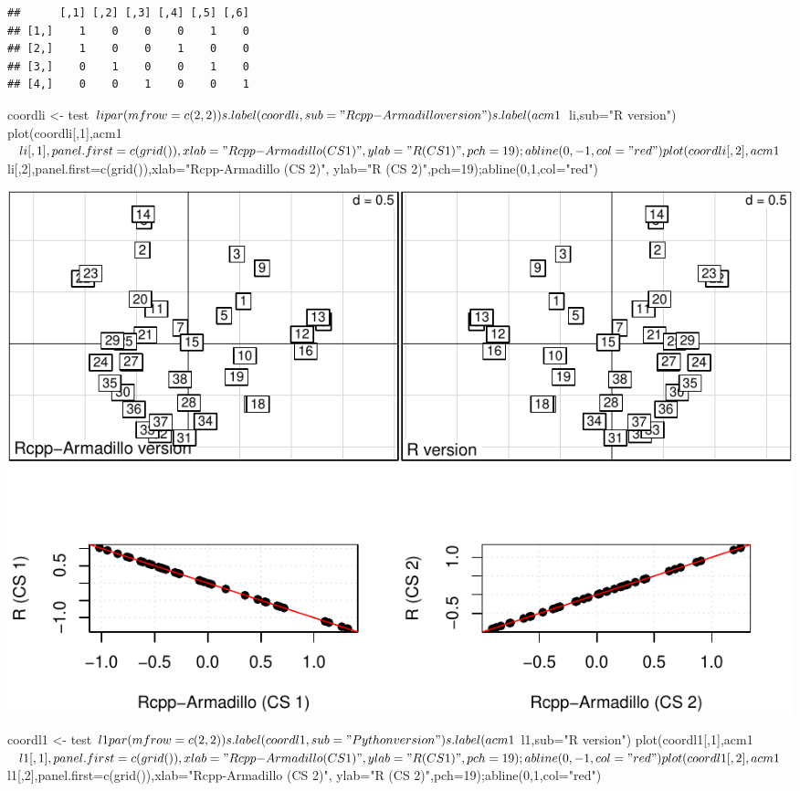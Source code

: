 \documentclass[
  10pt,
]{article}
\newenvironment{Shaded}{\begin{snugshade}}{\end{snugshade}}
\newcommand{\NormalTok}[1]{#1}
\begin{document}
\begin{verbatim}
##      [,1] [,2] [,3] [,4] [,5] [,6]
## [1,]    1    0    0    0    1    0
## [2,]    1    0    0    1    0    0
## [3,]    0    1    0    0    1    0
## [4,]    0    0    1    0    0    1
\end{verbatim}

\begin{Shaded}
\end{Shaded}

\begin{Shaded}
\begin{Highlighting}[]
\NormalTok{coordli \textless{}{-} test$li}
\NormalTok{par(mfrow=c(2,2))}
\NormalTok{s.label(coordli,sub="Rcpp{-}Armadillo version")}
\NormalTok{s.label(acm1$li,sub="R version")}
\NormalTok{plot(coordli[,1],acm1$li[,1],panel.first=c(grid()),xlab="Rcpp{-}Armadillo (CS 1)",}
\NormalTok{     ylab="R (CS 1)",pch=19);abline(0,{-}1,col="red")}
\NormalTok{plot(coordli[,2],acm1$li[,2],panel.first=c(grid()),xlab="Rcpp{-}Armadillo (CS 2)",}
\NormalTok{     ylab="R (CS 2)",pch=19);abline(0,1,col="red")}
\end{Highlighting}
\end{Shaded}

\includegraphics{RandPytonAnalysisPDF_files/figure-latex/unnamed-chunk-68-1.pdf}

\begin{Shaded}
\begin{Highlighting}[]
\NormalTok{coordl1 \textless{}{-} test$l1}
\NormalTok{par(mfrow=c(2,2))}
\NormalTok{s.label(coordl1,sub="Python version")}
\NormalTok{s.label(acm1$l1,sub="R version")}
\NormalTok{plot(coordl1[,1],acm1$l1[,1],panel.first=c(grid()),xlab="Rcpp{-}Armadillo (CS 1)",}
\NormalTok{     ylab="R (CS 1)",pch=19);abline(0,{-}1,col="red")}
\NormalTok{plot(coordl1[,2],acm1$l1[,2],panel.first=c(grid()),xlab="Rcpp{-}Armadillo (CS 2)",}
\NormalTok{     ylab="R (CS 2)",pch=19);abline(0,1,col="red")}
\end{Highlighting}
\end{Shaded}
\end{document}
